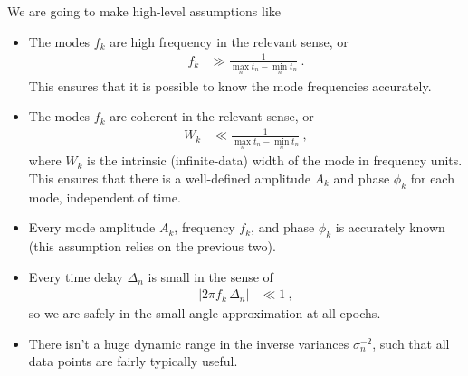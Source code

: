 \documentclass[12pt]{article}
\begin{document}
We are going to make high-level assumptions like
\begin{itemize}
  \item The modes $f_k$ are high frequency in the relevant sense, or
  \begin{align}
      f_k &\gg \frac{1}{\max_n t_n - \min_n t_n} ~.
  \end{align}
  This ensures that it is possible to know the mode frequencies accurately.
  \item The modes $f_k$ are coherent in the relevant sense, or
  \begin{align}
      W_k &\ll \frac{1}{\max_n t_n - \min_n t_n} ~,
  \end{align}
  where $W_k$ is the intrinsic (infinite-data) width of the mode in frequency units.
  This ensures that there is a well-defined amplitude $A_k$ and phase $\phi_k$ for each mode, independent of time.
  \item Every mode amplitude $A_k$, frequency $f_k$, and phase $\phi_k$ is accurately known (this assumption relies on the previous two).
  \item Every time delay $\Delta_n$ is small in the sense of
  \begin{align}
      |2\pi f_k\,\Delta_n| &\ll 1 ~,
  \end{align}
  so we are safely in the small-angle approximation at all epochs.
  \item There isn't a huge dynamic range in the inverse variances $\sigma_n^{-2}$, such that all data points are fairly typically useful.
\end{itemize}
\end{document}
